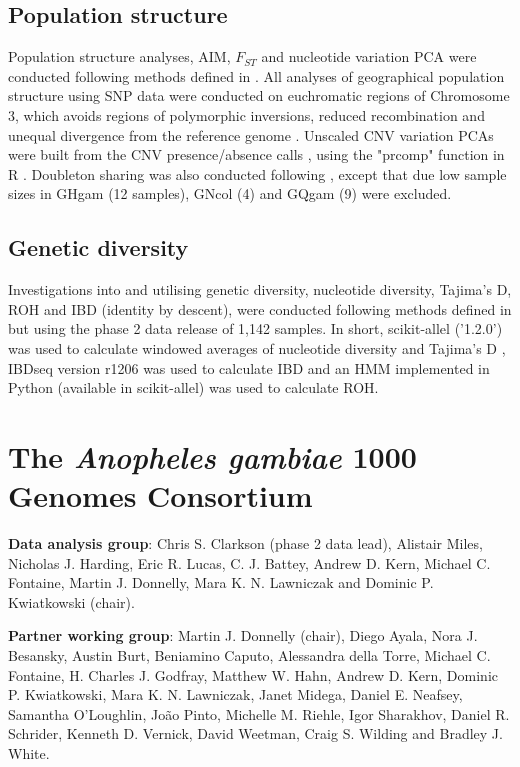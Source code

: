 \documentclass[a4paper,11pt,abstracton,hidelinks]{scrartcl}
\begin{document}
\subsection*{Population structure}

%
Population structure analyses, AIM, $F_{ST}$ and nucleotide variation PCA were conducted following methods defined in \cite{Ag1000G2017}.
%
All analyses of geographical population structure using SNP data were conducted on euchromatic regions of Chromosome 3, which avoids regions of polymorphic inversions, reduced recombination and unequal divergence from the reference genome \cite{Ag1000G2017}.
%
Unscaled CNV variation PCAs were built from the CNV presence/absence calls \cite{Lucas2019a}, using the "prcomp" function in R \cite{R}.
%
Doubleton sharing was also conducted following \cite{Ag1000G2017}, except that due low sample sizes in GHgam (12 samples), GNcol (4) and GQgam (9) were excluded.  


\subsection*{Genetic diversity}

%
Investigations into and utilising genetic diversity, nucleotide diversity, Tajima's D, ROH and IBD (identity by descent), were conducted following methods defined in \cite{Ag1000G2017} but using the phase 2 data release of 1,142 samples.
%
In short, scikit-allel ('1.2.0') was used to calculate windowed averages of nucleotide diversity and Tajima's D \cite{miles2018}, IBDseq version r1206 \cite{browning2015} was used to calculate IBD and an	HMM	implemented	in	Python (available in scikit-allel) was used to calculate ROH.

\section*{The \textit{Anopheles gambiae} 1000 Genomes Consortium}

%
\textbf{Data analysis group}: Chris S. Clarkson (phase 2 data lead), Alistair Miles, Nicholas J. Harding, Eric R. Lucas, C. J. Battey, Andrew D. Kern, Michael C. Fontaine, Martin J. Donnelly, Mara K. N. Lawniczak and Dominic P. Kwiatkowski (chair).

%
\textbf{Partner working group}: Martin J. Donnelly (chair), Diego Ayala, Nora J. Besansky, Austin Burt, Beniamino Caputo, Alessandra della Torre, Michael C. Fontaine, H. Charles J. Godfray, Matthew W. Hahn, Andrew D. Kern, Dominic P. Kwiatkowski, Mara K. N. Lawniczak, Janet Midega, Daniel E. Neafsey, Samantha O'Loughlin, Jo\~{a}o Pinto, Michelle M. Riehle, Igor Sharakhov, Daniel R. Schrider, Kenneth D. Vernick, David Weetman, Craig S. Wilding and Bradley J. White.
\end{document}
